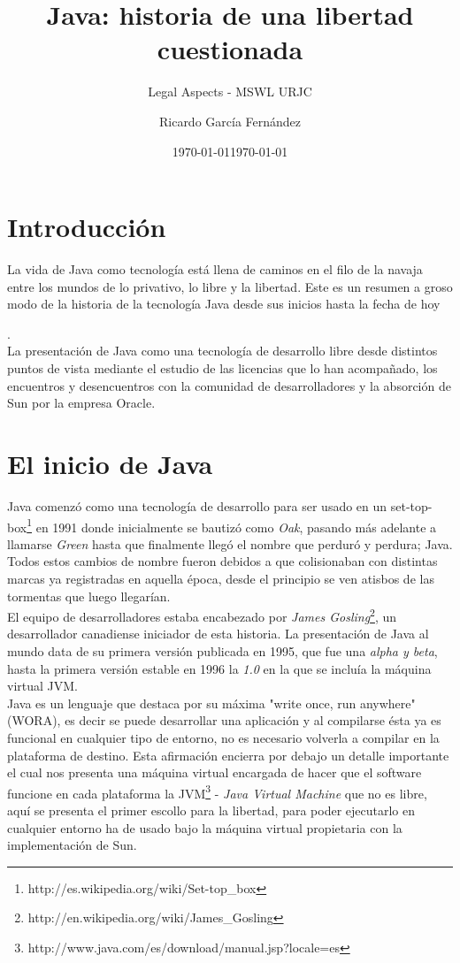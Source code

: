\documentclass[11pt]{scrartcl}
\title{\textbf{Java: historia de una libertad cuestionada}}
\subtitle{Legal Aspects - MSWL URJC}
\author{Ricardo García Fernández}
\date{\today}
\begin{document}
\maketitle

\newpage

\tableofcontents

\newpage

\section{Introducción}

La vida de Java como tecnología está llena de caminos en el filo de la navaja entre los mundos de lo privativo, lo libre y la libertad. Este es un resumen a groso modo de la historia de la tecnología Java desde sus inicios hasta la fecha de hoy \date{\today}.\\
La presentación de Java como una tecnología de desarrollo libre desde distintos puntos de vista mediante el estudio de las licencias que lo han acompañado, los encuentros y desencuentros con la comunidad de desarrolladores y la absorción de Sun por la empresa Oracle.

\section{El inicio de Java}

Java comenzó como una tecnología de desarrollo para ser usado en un set-top-box\footnote{http://es.wikipedia.org/wiki/Set-top\_box} en 1991 donde inicialmente se bautizó como \emph{Oak}, pasando más adelante a llamarse \emph{Green} hasta que finalmente llegó el nombre que perduró y perdura; Java.
Todos estos cambios de nombre fueron debidos a que colisionaban con distintas marcas ya registradas en aquella época, desde el principio se ven atisbos de las tormentas que luego llegarían.\\
El equipo de desarrolladores estaba encabezado por \emph{James Gosling}\footnote{http://en.wikipedia.org/wiki/James\_Gosling}, un desarrollador canadiense iniciador de esta historia. La presentación de Java al mundo data de su primera versión publicada en 1995, que fue una \emph{alpha y beta}, hasta la primera versión estable en 1996 la \emph{1.0} en la que se incluía la máquina virtual JVM.\\
Java es un lenguaje que destaca por su máxima "write once, run anywhere" (WORA), es decir se puede desarrollar una aplicación y al compilarse ésta ya es funcional en cualquier tipo de entorno, no es necesario volverla a compilar en la plataforma de destino. Esta afirmación encierra por debajo un detalle importante el cual nos presenta una máquina virtual encargada de hacer que el software funcione en cada plataforma la JVM\footnote{http://www.java.com/es/download/manual.jsp?locale=es} - \emph{Java Virtual Machine} que no es libre, aquí se presenta el primer escollo para la libertad, para poder ejecutarlo en cualquier entorno ha de usado bajo la máquina virtual propietaria con la implementación de Sun.
\end{document}
